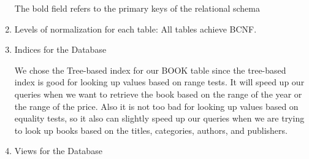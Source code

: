 \documentclass[12pt, letterpaper]{report}
\begin{document}
\begin{enumerate}
    The bold field refers to the primary keys of the relational schema

  \item Levels of normalization for each table:
    All tables achieve BCNF.

  \item Indices for the Database

    We chose the Tree-based index for our BOOK table since the tree-based index is good for looking up values based on range tests. It will speed up our queries when we want to retrieve the book based on the range of the year or the range of the price. Also it is not too bad for looking up values based on equality tests, so it also can slightly speed up our queries when we are trying to look up books based on the titles, categories, authors, and publishers.

  \item Views for the Database

\end{enumerate}
\end{document}
